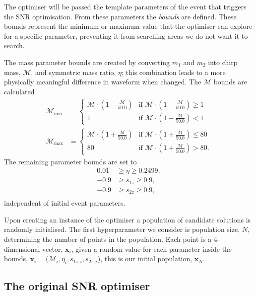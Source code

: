 The optimiser will be passed the template parameters of the event that triggers the SNR optimisation. From these parameters the \textit{bounds} are defined. These bounds represent the minimum or maximum value that the optimiser can explore for a specific parameter, preventing it from searching areas we do not want it to search.

The mass parameter bounds are created by converting $m_{1}$ and $m_{2}$ into chirp mass, $\mathcal{M}$, and symmetric mass ratio, $\eta$; this combination leads to a more physically meaningful difference in waveform when changed. The $\mathcal{M}$ bounds are calculated
%
\begin{align}
    \mathcal{M}_{\min} &= 
    \begin{cases}
        \mathcal{M} \cdot \left(1 - \frac{\mathcal{M}}{50.0}\right) & \text{if } \mathcal{M} \cdot \left(1 - \frac{\mathcal{M}}{50.0}\right) \geq 1 \\
        1 & \text{if } \mathcal{M} \cdot \left(1 - \frac{\mathcal{M}}{50.0}\right) < 1
    \end{cases} \\
    \mathcal{M}_{\max} &= 
    \begin{cases}
        \mathcal{M} \cdot \left(1 + \frac{\mathcal{M}}{50.0}\right) & \text{if } \mathcal{M} \cdot \left(1 + \frac{\mathcal{M}}{50.0}\right) \leq 80 \\
        80 & \text{if } \mathcal{M} \cdot \left(1 + \frac{\mathcal{M}}{50.0}\right) > 80.
    \end{cases}
\end{align}
%
The remaining parameter bounds are set to
%
\begin{align}
    0.01 &\ge \eta \ge 0.2499, \\
    -0.9 &\ge s_{1z} \ge 0.9, \\
    -0.9 &\ge s_{2z} \ge 0.9, \\
\end{align}
%
independent of initial event parameters.

Upon creating an instance of the optimiser a population of candidate solutions is randomly initialised. The first hyperparameter we consider is population size, $N$, determining the number of points in the population. Each point is a 4-dimensional vector, $\textbf{x}_{i}$, given a random value for each parameter inside the bounds, $\textbf{x}_{i} = (\mathcal{M}_{i}, \eta_{i}, s_{1z, i}, s_{2z, i}$), this is our initial population, $\textbf{x}_{N}$.

\subsection{\label{7:sec:original_de}The original SNR optimiser}

